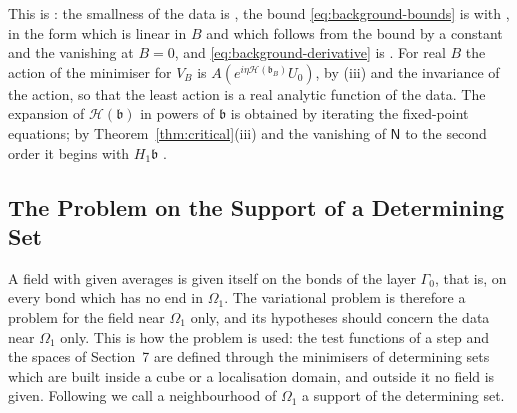 \documentclass[11pt]{preprint}
\numberwithin{equation}{section}
\begin{document}
This is \cite[Proposition~9, p.~309]{BalabanVAR}: the smallness of the data is \cite[(172)]{BalabanVAR}, the bound \eqref{eq:background-bounds} is \cite[(173)]{BalabanVAR} with \cite[(19)--(21), p.~281]{BalabanVAR}, in the form which is linear in $B$ and which follows from the bound by a constant and the vanishing at $B = 0$, and \eqref{eq:background-derivative} is \cite[(190), p.~308]{BalabanVAR}. For real $B$ the action of the minimiser for $V_B$ is $A(e^{i\eta\mathcal H(\mathfrak b_B)}U_0)$, by (iii) and the invariance of the action, so that the least action is a real analytic function of the data. The expansion of $\mathcal H(\mathfrak b)$ in powers of $\mathfrak b$ is obtained by iterating the fixed-point equations; by Theorem~\ref{thm:critical}(iii) and the vanishing of $\mathsf N$ to the second order it begins with $H_1\mathfrak b$ \cite[(176), (177), p.~306]{BalabanVAR}.

\subsection{The Problem on the Support of a Determining Set}\label{sec:support}

A field with given averages is given itself on the bonds of the layer $\Gamma_0$, that is, on every bond which has no end in $\Omega_1$. The variational problem is therefore a problem for the field near $\Omega_1$ only, and its hypotheses should concern the data near $\Omega_1$ only. This is how the problem is used: the test functions of a step and the spaces of Section~7 are defined through the minimisers of determining sets which are built inside a cube or a localisation domain, and outside it no field is given. Following \cite[p.~255]{BalabanCRE} we call a neighbourhood of $\Omega_1$ a support of the determining set.
\end{document}
